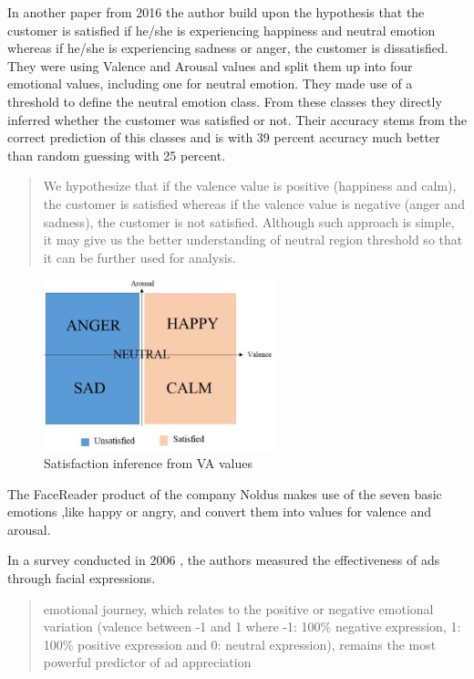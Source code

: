 In another paper from 2016 \cite{Kamaruddin:2016:CustomerSatisfactionFromVA} the author build upon the hypothesis that the customer is satisfied if he/she is experiencing happiness and neutral emotion whereas if he/she is experiencing sadness or anger, the customer is dissatisfied. They were using Valence and Arousal values and split them up into four emotional values, including one for neutral emotion. They made use of a threshold to define the neutral emotion class. From these classes they directly inferred whether the customer was satisfied or not. Their accuracy stems from the correct prediction of this classes and is with 39 percent accuracy much better than random guessing with 25 percent.

\begin{quote}
    We hypothesize that if the valence value is positive (happiness and calm), the customer is satisfied whereas if the valence value is negative (anger and sadness), the customer is not satisfied. Although such approach is simple, it may give us the better understanding of neutral region threshold so that it can be further used for analysis. \cite{Kamaruddin:2016:CustomerSatisfactionFromVA}
\end{quote}

\begin{figure}[H]
  \begin{center}
  \includegraphics[angle=0, width=0.6\textwidth]{Figures/Satisfaction_from_VA.PNG}
  \caption{Satisfaction inference from VA values}
  \label{fig:SatisfactionFromVA}
  \end{center}
\end{figure}

The FaceReader product of the company Noldus\cite{Noldus:2020:Facereader} makes use of the seven basic emotions ,like happy or angry, and convert them into values for valence and arousal.

In a survey conducted in 2006 \cite{Poirier:2016:AdsFacialExpression}, the authors measured the effectiveness of ads through facial expressions.
\begin{quote}
    emotional journey, which relates to the positive or negative emotional variation  (valence between -1 and 1 where -1: 100\% negative expression, 1: 100\% positive expression and 0: neutral expression), remains the most powerful predictor of ad appreciation 
\end{quote}

